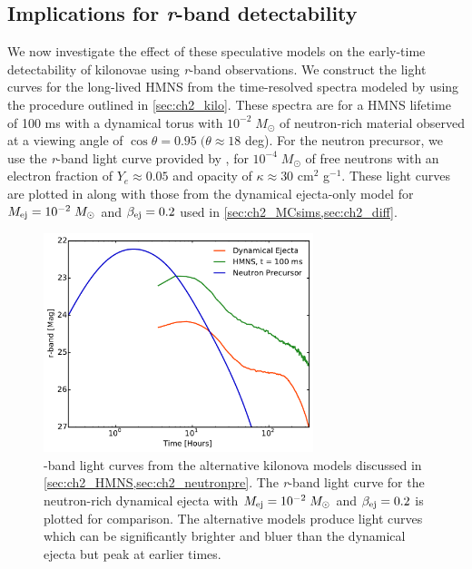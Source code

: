 \subsection{Implications for {\em r}-band detectability}
We now investigate the effect of these speculative models on the early-time detectability of kilonovae using {\em r}-band observations. We construct the light curves for the long-lived HMNS from the time-resolved spectra modeled by \citet{Kasen+15} using the procedure outlined in \cref{sec:ch2_kilo}. These spectra are for a HMNS lifetime of 100 ms with a dynamical torus with $10^{-2}\;M_{\odot}$ of neutron-rich material observed at a viewing angle of $\cos{\theta} = 0.95\; (\theta \approx 18$ deg). For the neutron precursor, we use the {\em r}-band light curve provided by \citet{Metzger+15}, for $10^{-4}\;M_{\odot}$ of free neutrons with an electron fraction of $Y_e \approx 0.05$ and opacity of $\kappa \approx 30$ cm$^2$ g$^{-1}$. These light curves are plotted in  along with those from the dynamical ejecta-only model for $M_{{\rm ej}} = 10^{-2}\;M_{\odot}$ and $\beta_{{\rm ej}} = 0.2$ used in \cref{sec:ch2_MCsims,sec:ch2_diff}.

\begin{figure}[h!]
\centering
\includegraphics[width=0.7\textwidth]{./figs/chapter2/f20.pdf}
\caption{-band light curves from the alternative kilonova models discussed in \cref{sec:ch2_HMNS,sec:ch2_neutronpre}. The {\em r}-band light curve for the neutron-rich dynamical ejecta with $M_{{\rm ej}} = 10^{-2}\;M_{\odot}$ and $\beta_{{\rm ej}} = 0.2$ is plotted for comparison. The alternative models produce light curves which can be significantly brighter and bluer than the dynamical ejecta but peak at earlier times.}
\label{fig:ch2_altLC}
\end{figure}

